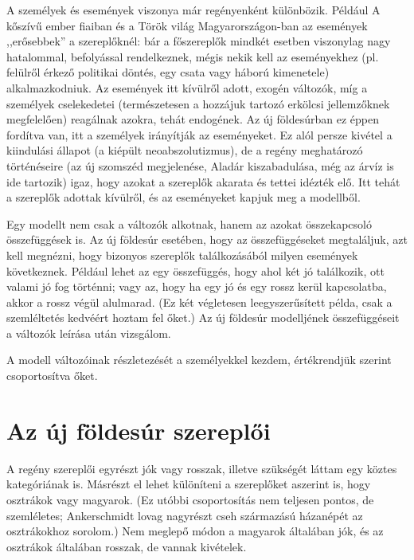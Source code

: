 \documentclass[a4paper,12pt]{thesis-ekf}
\begin{document}
    A személyek és események viszonya már regényenként különbözik.
    Például A kőszívű ember fiaiban és a Török világ Magyarországon-ban az események ,,erősebbek'' a szereplőknél:
        bár a főszereplők mindkét esetben viszonylag nagy hatalommal, befolyással rendelkeznek, mégis nekik kell az
        eseményekhez (pl. felülről érkező politikai döntés, egy csata vagy háború kimenetele) alkalmazkodniuk.
    Az események itt kívülről adott, exogén változók, míg a személyek cselekedetei
        (természetesen a hozzájuk tartozó erkölcsi jellemzőknek megfelelően) reagálnak azokra, tehát endogének.
    Az új földesúrban ez éppen fordítva van, itt a személyek irányítják az eseményeket.
    Ez alól persze kivétel a kiindulási állapot (a kiépült neoabszolutizmus), de a regény meghatározó történéseire
        (az új szomszéd megjelenése, Aladár kiszabadulása, még az árvíz is ide tartozik) igaz,
        hogy azokat a szereplők akarata és tettei idézték elő.
    Itt tehát a szereplők adottak kívülről, és az eseményeket kapjuk meg a modellből.

    Egy modellt nem csak a változók alkotnak, hanem az azokat összekapcsoló összefüggések is.
    Az új földesúr esetében, hogy az összefüggéseket megtaláljuk, azt kell megnézni, hogy bizonyos szereplők
        találkozásából milyen események következnek.
    Például lehet az egy összefüggés, hogy ahol két jó találkozik, ott valami jó fog történni;
        vagy az, hogy ha egy jó és egy rossz kerül kapcsolatba, akkor a rossz végül alulmarad.
    (Ez két végletesen leegyszerűsített példa, csak a szemléltetés kedvéért hoztam fel őket.)
    Az új földesúr modelljének összefüggéseit a változók leírása után vizsgálom.

    A modell változóinak részletezését a személyekkel kezdem, értékrendjük szerint csoportosítva őket.


    \section{Az új földesúr szereplői}\label{sec:az-uj-foldesur-szereploi}

    A regény szereplői egyrészt jók vagy rosszak, illetve szükségét láttam egy köztes kategóriának is.
    Másrészt el lehet különíteni a szereplőket aszerint is, hogy osztrákok vagy magyarok.
    (Ez utóbbi csoportosítás nem teljesen pontos, de szemléletes;
        Ankerschmidt lovag nagyrészt cseh származású házanépét az osztrákokhoz sorolom.)
    Nem meglepő módon a magyarok általában jók, és az osztrákok általában rosszak, de vannak kivételek.
\end{document}
